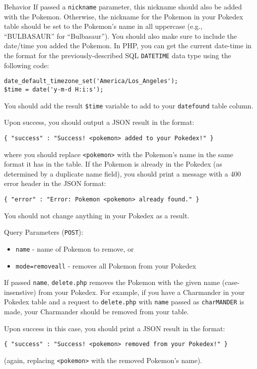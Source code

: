 \documentclass[programming]{../../../../mfcs}
\begin{document}
\begin{question}{Behavior}
  If passed a \texttt{nickname} parameter, this nickname should also be added with the Pokemon. 
  Otherwise, the nickname for the
  Pokemon in your Pokedex table should be set to the Pokemon's name in all uppercase (e.g.,
  ``BULBASAUR'' for ``Bulbasaur''). You should also make sure to
  include the date/time you added the Pokemon. In PHP, you can get the current date-time in the
  format for the previously-described SQL \texttt{DATETIME} data type using the following code:
  \begin{verbatim}
date_default_timezone_set('America/Los_Angeles');
$time = date('y-m-d H:i:s');\end{verbatim}
  You should add the result \texttt{\$time} variable to add to your \texttt{datefound} table column.
  \newline

  Upon success, you should output a JSON result in the format:
  \begin{verbatim}
{ "success" : "Success! <pokemon> added to your Pokedex!" }\end{verbatim}
  where you should replace \texttt{<pokemon>} with the Pokemon's name in the same format it has in
  the table. If the Pokemon is
  already in the Pokedex (as determined by a duplicate name field), you should print a message with
  a 400 error header in
  the JSON format: 
  \begin{verbatim}{ "error" : "Error: Pokemon <pokemon> already found." }\end{verbatim}
  You should not change anything in your
  Pokedex as a result. 

  Query Parameters (\texttt{POST}):
  \begin{itemize}
    \item \texttt{name} - name of Pokemon to remove, or
    \item \texttt{mode=removeall} - removes all Pokemon from your Pokedex 
  \end{itemize}
  If passed \texttt{name}, \texttt{delete.php} removes the Pokemon with the given name
  (case-insenstive) from your Pokedex. For example, if you have a Charmander in your Pokedex table
  and a request to \texttt{delete.php} with \texttt{name} passed as \texttt{charMANDER} is made,
  your Charmander should be removed from your table.
  \newline

  Upon success in this case, you should print a JSON result in the format:
  \begin{verbatim}
{ "success" : "Success! <pokemon> removed from your Pokedex!" }\end{verbatim}
  (again, replacing \texttt{<pokemon>} with the removed Pokemon's name).
  \newline


\end{question}
\end{document}

